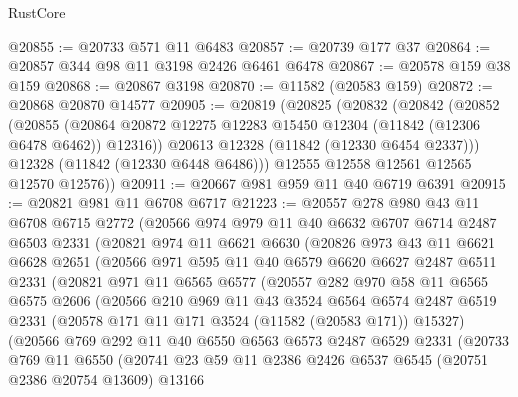 \begin{lexlean}{RustCore}
\begin{coremodule}
@20855 := @20733 @571 @11 @6483
@20857 := @20739 @177 @37
@20864 := @20857 @344 @98 @11 @3198 @2426 @6461 @6478
@20867 := @20578 @159 @38 @159
@20868 := @20867 @3198
@20870 := @11582 (@20583 @159)
@20872 := @20868 @20870 @14577
@20905 := @20819
    (@20825
      (@20832
        (@20842
          (@20852
            (@20855
              (@20864 @20872 @12275 @12283 @15450 @12304 (@11842 (@12306 @6478 @6462)) @12316))
            @20613
            @12328
            (@11842 (@12330 @6454 @2337)))
          @12328
          (@11842 (@12330 @6448 @6486)))
        @12555
        @12558
        @12561
        @12565
        @12570
        @12576))
@20911 := @20667 @981 @959 @11 @40 @6719 @6391
@20915 := @20821 @981 @11 @6708 @6717
@21223 := @20557
    @278
    @980
    @43
    @11
    @6708
    @6715
    @2772
    (@20566
      @974
      @979
      @11
      @40
      @6632
      @6707
      @6714
      @2487
      @6503
      @2331
      (@20821
        @974
        @11
        @6621
        @6630
        (@20826
          @973
          @43
          @11
          @6621
          @6628
          @2651
          (@20566
            @971
            @595
            @11
            @40
            @6579
            @6620
            @6627
            @2487
            @6511
            @2331
            (@20821
              @971
              @11
              @6565
              @6577
              (@20557
                @282
                @970
                @58
                @11
                @6565
                @6575
                @2606
                (@20566
                  @210
                  @969
                  @11
                  @43
                  @3524
                  @6564
                  @6574
                  @2487
                  @6519
                  @2331
                  (@20578 @171 @11 @171 @3524 (@11582 (@20583 @171)) @15327)
                  (@20566
                    @769
                    @292
                    @11
                    @40
                    @6550
                    @6563
                    @6573
                    @2487
                    @6529
                    @2331
                    (@20733
                      @769
                      @11
                      @6550
                      (@20741
                        @23
                        @59
                        @11
                        @2386
                        @2426
                        @6537
                        @6545
                        (@20751 @2386 @20754 @13609)
                        @13166

\end{coremodule}
\end{lexlean}
